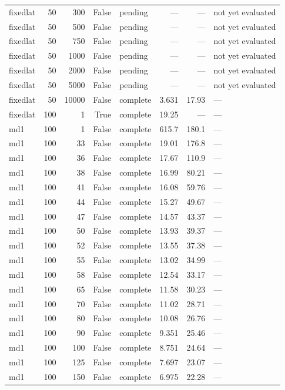 \begin{tabular}{lrrrlrrl}
fixedlat & 50 & 300 & False & pending & — & — & not yet evaluated \\
fixedlat & 50 & 500 & False & pending & — & — & not yet evaluated \\
fixedlat & 50 & 750 & False & pending & — & — & not yet evaluated \\
fixedlat & 50 & 1000 & False & pending & — & — & not yet evaluated \\
fixedlat & 50 & 2000 & False & pending & — & — & not yet evaluated \\
fixedlat & 50 & 5000 & False & pending & — & — & not yet evaluated \\
fixedlat & 50 & 10000 & False & complete & 3.631 & 17.93 & — \\
fixedlat & 100 & 1 & True & complete & 19.25 & — & — \\
md1 & 100 & 1 & False & complete & 615.7 & 180.1 & — \\
md1 & 100 & 33 & False & complete & 19.01 & 176.8 & — \\
md1 & 100 & 36 & False & complete & 17.67 & 110.9 & — \\
md1 & 100 & 38 & False & complete & 16.99 & 80.21 & — \\
md1 & 100 & 41 & False & complete & 16.08 & 59.76 & — \\
md1 & 100 & 44 & False & complete & 15.27 & 49.67 & — \\
md1 & 100 & 47 & False & complete & 14.57 & 43.37 & — \\
md1 & 100 & 50 & False & complete & 13.93 & 39.37 & — \\
md1 & 100 & 52 & False & complete & 13.55 & 37.38 & — \\
md1 & 100 & 55 & False & complete & 13.02 & 34.99 & — \\
md1 & 100 & 58 & False & complete & 12.54 & 33.17 & — \\
md1 & 100 & 65 & False & complete & 11.58 & 30.23 & — \\
md1 & 100 & 70 & False & complete & 11.02 & 28.71 & — \\
md1 & 100 & 80 & False & complete & 10.08 & 26.76 & — \\
md1 & 100 & 90 & False & complete & 9.351 & 25.46 & — \\
md1 & 100 & 100 & False & complete & 8.751 & 24.64 & — \\
md1 & 100 & 125 & False & complete & 7.697 & 23.07 & — \\
md1 & 100 & 150 & False & complete & 6.975 & 22.28 & — \\

\end{tabular}
